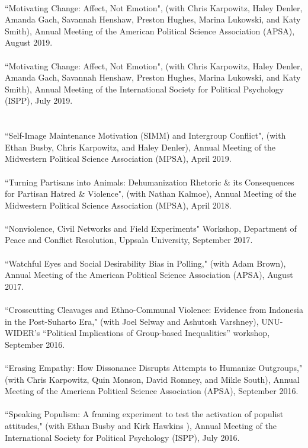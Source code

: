 \documentclass[10pt]{article}
\begin{document}
\ \\
``Motivating Change: Affect, Not Emotion", (with Chris Karpowitz, Haley Denler, Amanda Gach, Savannah Henshaw, Preston Hughes, Marina Lukowski, and Katy Smith), Annual Meeting of the American Political Science Association (APSA), August 2019.\\
\ \\
``Motivating Change: Affect, Not Emotion", (with Chris Karpowitz, Haley Denler, Amanda Gach, Savannah Henshaw, Preston Hughes, Marina Lukowski, and Katy Smith), Annual Meeting of the International Society for Political Psychology (ISPP), July 2019.\\
\ \\
\ \\
``Self-Image Maintenance Motivation (SIMM) and Intergroup Conflict", (with Ethan Busby, Chris Karpowitz, and Haley Denler), Annual Meeting of the Midwestern Political Science Association (MPSA), April 2019.\\
\ \\
``Turning Partisans into Animals: Dehumanization Rhetoric \& its Consequences for Partisan Hatred \& Violence", (with Nathan Kalmoe), Annual Meeting of the Midwestern Political Science Association (MPSA), April 2018.\\
\ \\
``Nonviolence, Civil Networks and Field Experiments" Workshop, Department of Peace and Conflict Resolution, Uppsala University, September 2017.\\
\ \\
``Watchful Eyes and Social Desirability Bias in Polling," (with Adam Brown), Annual Meeting of the American Political Science Association (APSA), August 2017.\\
\ \\
``Crosscutting Cleavages and Ethno-Communal Violence: Evidence from Indonesia in the Post-Suharto Era," (with Joel Selway and Ashutosh Varshney), UNU-WIDER’s ``Political Implications of Group-based Inequalities'' workshop, September 2016.\\
\ \\
``Erasing Empathy: How Dissonance Disrupts Attempts to Humanize Outgroups," (with Chris Karpowitz, Quin Monson, David Romney, and Mikle South), Annual Meeting of the American Political Science Association (APSA), September 2016.\\
\ \\
``Speaking Populism: A framing experiment to test the activation of populist attitudes," (with Ethan Busby and Kirk Hawkins ), Annual Meeting of the International Society for Political Psychology (ISPP), July 2016.\\
\end{document}
